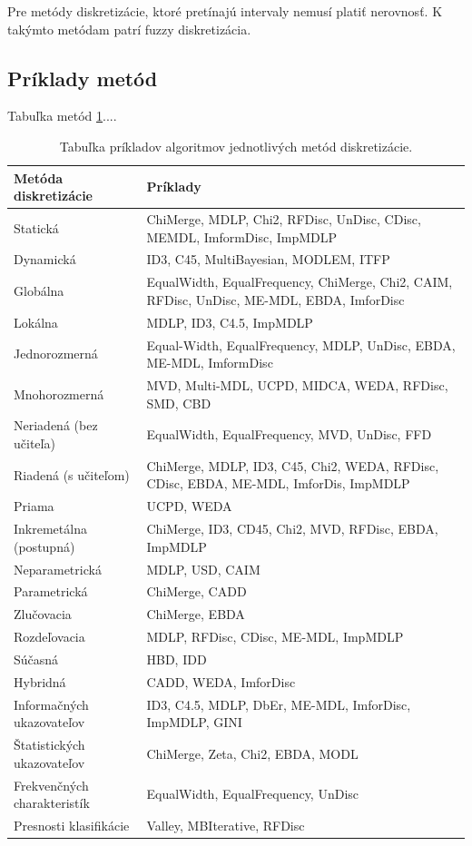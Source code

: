Pre metódy diskretizácie, ktoré pretínajú intervaly nemusí platiť nerovnosť. K takýmto metódam patrí fuzzy diskretizácia. 

\subsection{Príklady metód}
Tabuľka metód \ref{table:1}.... 
\begin{table}[h!]
	\centering
\begin{tabular} { |p{5cm}|p{10cm}| }
	\hline 
	\textbf{Metóda diskretizácie} & \textbf{Príklady} \\ 
	\hline 
	Statická & ChiMerge, MDLP, Chi2, RFDisc, UnDisc, CDisc, MEMDL, ImformDisc, ImpMDLP \\ 
	\hline 
	Dynamická & ID3, C45, MultiBayesian, MODLEM, ITFP \\ 
	\hline 
	Globálna  & EqualWidth, EqualFrequency, ChiMerge, Chi2, CAIM, RFDisc, UnDisc, ME-MDL, EBDA, ImforDisc \\ 
	\hline 
	Lokálna & MDLP, ID3, C4.5, ImpMDLP \\ 
	\hline 
	Jednorozmerná & Equal-Width, EqualFrequency, MDLP, UnDisc, EBDA, ME-MDL, ImformDisc \\ 
	\hline 
	Mnohorozmerná & MVD, Multi-MDL, UCPD, MIDCA, WEDA, RFDisc, SMD, CBD \\ 
	\hline 
	Neriadená (bez učiteľa)  & EqualWidth, EqualFrequency, MVD, UnDisc, FFD \\ 
	\hline 
	Riadená (s učiteľom) & ChiMerge, MDLP, ID3, C45, Chi2, WEDA, RFDisc, CDisc, EBDA, ME-MDL, ImforDis, ImpMDLP \\ 
	\hline 
	Priama & UCPD, WEDA \\ 
	\hline 
	Inkremetálna (postupná) & ChiMerge, ID3, CD45, Chi2, MVD, RFDisc, EBDA, ImpMDLP \\ 
	\hline 
	Neparametrická & MDLP, USD, CAIM \\ 
	\hline 
	Parametrická & ChiMerge, CADD \\ 
	\hline 
	Zlučovacia & ChiMerge, EBDA \\ 
	\hline 
	Rozdeľovacia & MDLP, RFDisc, CDisc, ME-MDL, ImpMDLP \\ 
		\hline 	Súčasná & HBD, IDD \\ 
	\hline 
	Hybridná  & CADD, WEDA, ImforDisc \\ 
	\hline 
		Informačných ukazovateľov & ID3, C4.5, MDLP, DbEr, ME-MDL, ImforDisc, ImpMDLP, GINI \\ 
	\hline 
	Štatistických ukazovateľov & ChiMerge, Zeta, Chi2, EBDA, MODL \\ 
	\hline 
Frekvenčných charakteristík & EqualWidth, EqualFrequency, UnDisc \\ 
	\hline 
Presnosti klasifikácie & Valley, MBIterative, RFDisc \\ 
	\hline 

\end{tabular} 
\caption{Tabuľka príkladov algoritmov jednotlivých metód diskretizácie.}
\label{table:1}
\end{table}
